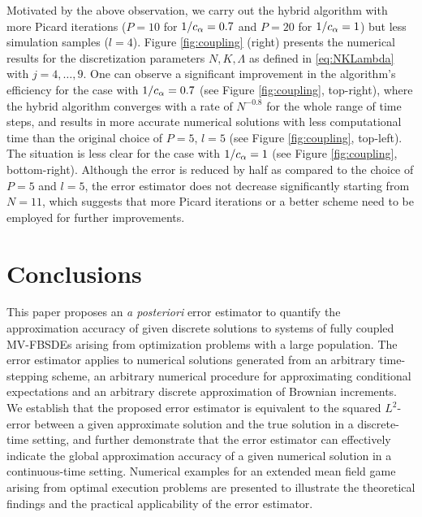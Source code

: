 \documentclass[11pt]{article}
\numberwithin{equation}{section}
\theoremstyle{definition}
\theoremstyle{remark}
\begin{document}
Motivated by the above observation,
we carry out the hybrid algorithm with 
 more Picard iterations 
($P=10$ for $1/c_\alpha=0.7$ and $P=20$ for $1/c_\alpha=1$)
but less simulation samples
($l=4$).
Figure \ref{fig:coupling} (right)
presents 
the numerical results for 
the discretization parameters $N, K,\Lambda$ as defined in \eqref{eq:NKLambda}
with $j=4,\ldots, 9$.
One can observe 
a significant improvement in the algorithm's efficiency
for the case with $1/c_\alpha=0.7$ (see Figure \ref{fig:coupling}, top-right),
where
the hybrid algorithm converges with a rate of $N^{-0.8}$
for the whole range of time steps,
and results in more accurate numerical solutions with less computational time
than the original choice of $P=5$, $l=5$ (see Figure \ref{fig:coupling}, top-left).
The situation is less clear for  the case with $1/c_\alpha=1$ (see Figure \ref{fig:coupling}, bottom-right).
Although the error is reduced by half
as compared to the choice of $P=5$ and $l=5$,
the error estimator does not decrease significantly starting from $N=11$,
which suggests that
more Picard iterations or a better scheme need to be employed for further improvements.















\section{Conclusions}

This paper proposes an \textit{a posteriori} error estimator to quantify the approximation accuracy 
of given discrete solutions to systems of
fully coupled MV-FBSDEs
arising from
optimization problems with a large population.
The error estimator applies to numerical solutions 
generated
from an arbitrary time-stepping scheme,
an arbitrary numerical procedure for approximating conditional expectations
and an arbitrary discrete
approximation of  Brownian increments.
We establish that 
the proposed error estimator is equivalent to 
the squared $L^2$-error between a given approximate solution 
and the true solution in a discrete-time setting,
and further demonstrate that
the  error estimator can effectively indicate 
the global approximation accuracy of  a given numerical solution 
 in a continuous-time setting.
 Numerical examples for an extended mean field game arising from optimal execution problems
  are presented to illustrate the theoretical findings
  and the practical applicability of the error estimator.
\end{document}
